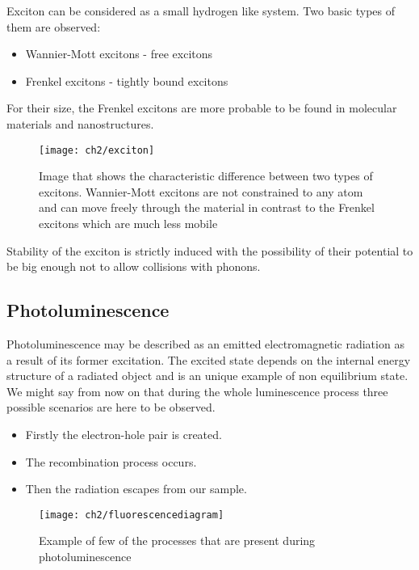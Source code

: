 Exciton can be considered as a small hydrogen like system. Two basic types of them are observed:

\begin{itemize}
\item Wannier-Mott excitons - free excitons
\item Frenkel excitons - tightly bound excitons
\end{itemize}

For their size, the Frenkel excitons are more probable to be found in molecular materials and nanostructures. 

\begin{figure}[H]
\centering
\texttt{[image: ch2/exciton]}
\caption{Image that shows the characteristic difference between two types of excitons. Wannier-Mott excitons are not constrained to any atom and can move freely through the material in contrast to the Frenkel excitons which are much less mobile\cite{fox}}
\end{figure}

Stability of the exciton is strictly induced with the possibility of their potential to be big enough not to allow collisions with phonons.

\subsection{Photoluminescence}

Photoluminescence may be described as an emitted electromagnetic radiation as a result of its former excitation. The excited state depends on the internal energy structure of a radiated object and is an unique example of non equilibrium state. We might say from now on that during the whole luminescence process three possible scenarios are here to be observed. 
\begin{itemize}
\item Firstly the electron-hole pair is created.
\item The recombination process occurs.
\item Then the radiation escapes from our sample.
\end{itemize}

\begin{figure}[H]
\centering
\texttt{[image: ch2/fluorescencediagram]}
\caption{Example of few of the processes that are present during photoluminescence\cite{princeton}}
\end{figure}


